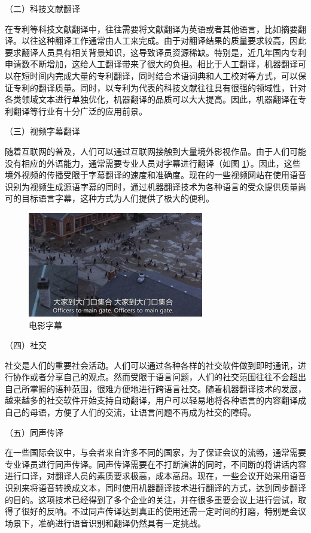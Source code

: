 \parinterval （二）科技文献翻译

\parinterval 在专利等科技文献翻译中，往往需要将文献翻译为英语或者其他语言，比如摘要翻译。以往这种翻译工作通常由人工来完成。由于对翻译结果的质量要求较高，因此要求翻译人员具有相关背景知识，这导致译员资源稀缺。特别是，近几年国内专利申请数不断增加，这给人工翻译带来了很大的负担。相比于人工翻译，机器翻译可以在短时间内完成大量的专利翻译，同时结合术语词典和人工校对等方式，可以保证专利的翻译质量。同时，以专利为代表的科技文献往往具有很强的领域性，针对各类领域文本进行单独优化，机器翻译的品质可以大大提高。因此，机器翻译在专利翻译等行业有十分广泛的应用前景。

\parinterval （三）视频字幕翻译

\parinterval 随着互联网的普及，人们可以通过互联网接触到大量境外影视作品。由于人们可能没有相应的外语能力，通常需要专业人员对字幕进行翻译（如图
\ref{fig:1-13}）。因此，这些境外视频的传播受限于字幕翻译的速度和准确度。现在的一些视频网站在使用语音识别为视频生成源语字幕的同时，通过机器翻译技术为各种语言的受众提供质量尚可的目标语言字幕，这种方式为人们提供了极大的便利。

\begin{figure}[htp]
    \centering
\includegraphics[scale=1.2]{./Chapter1/Figures/figure-film-subtitles.jpg}
    \caption{电影字幕}
    \label{fig:1-13}
\end{figure}

\parinterval （四）社交

\parinterval 社交是人们的重要社会活动。人们可以通过各种各样的社交软件做到即时通讯，进行协作或者分享自己的观点。然而受限于语言问题，人们的社交范围往往不会超出自己所掌握的语种范围，很难方便地进行跨语言社交。随着机器翻译技术的发展，越来越多的社交软件开始支持自动翻译，用户可以轻易地将各种语言的内容翻译成自己的母语，方便了人们的交流，让语言问题不再成为社交的障碍。

\parinterval （五）同声传译

\parinterval 在一些国际会议中，与会者来自许多不同的国家，为了保证会议的流畅，通常需要专业译员进行同声传译。同声传译需要在不打断演讲的同时，不间断的将讲话内容进行口译，对翻译人员的素质要求极高，成本高昂。现在，一些会议开始采用语音识别来将语音转换成文本，同时使用机器翻译技术进行翻译的方式，达到同步翻译的目的。这项技术已经得到了多个企业的关注，并在很多重要会议上进行尝试，取得了很好的反响。不过同声传译达到真正的使用还需一定时间的打磨，特别是会议场景下，准确进行语音识别和翻译仍然具有一定挑战。

